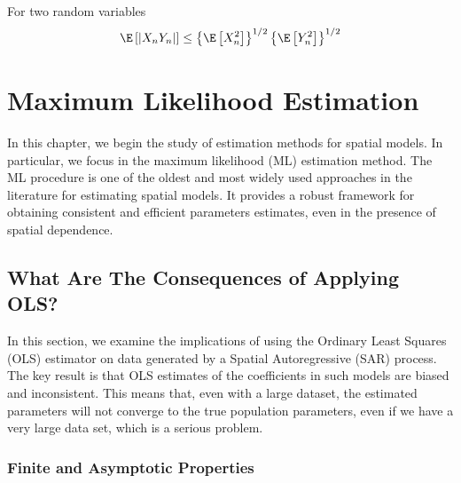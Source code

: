 \documentclass[english,12pt]{book}\usepackage[]{graphicx}\usepackage[]{xcolor}
\begin{document}
\begin{subappendices}
\begin{definition}\label{theorem:Cauchy-Inequality}
For two random variables
\begin{equation*}
  \E\left[\left|X_nY_n\right|\right]\leq \left\lbrace \E\left[X_n^2\right]\right\rbrace^{1/2} \left\lbrace \E\left[Y_n^2\right]\right\rbrace^{1/2} 
\end{equation*}
\end{definition}


\end{subappendices}


\chapter{Maximum Likelihood Estimation}\label{chap:ML}

In this chapter, we begin the study of estimation methods for spatial models. In particular, we focus in the maximum likelihood (ML) estimation method. The ML procedure is one of the oldest and most widely used approaches in the literature for estimating spatial models. It provides a robust framework for obtaining consistent and efficient parameters estimates, even in the presence of spatial dependence.


\section{What Are The Consequences of Applying OLS?}\label{sec:consequences_slm}

In this section, we examine the implications of using the Ordinary Least Squares (OLS) estimator on data generated by a Spatial Autoregressive (SAR) process. The key result is that OLS estimates of the coefficients in such models are biased and inconsistent. This means that, even with a large dataset, the estimated parameters will not converge to the true population parameters, even if we have a very large data set, which is a serious problem.

\subsection{Finite and Asymptotic Properties}
\end{document}
